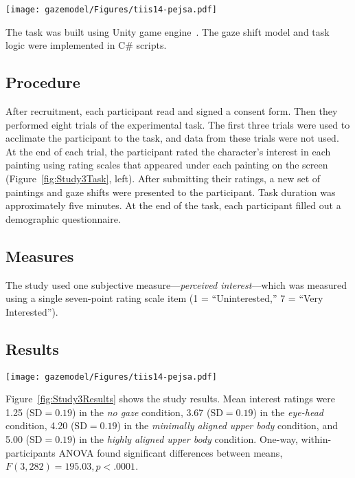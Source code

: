 \begin{figure*}
\centering
\texttt{[image: gazemodel/Figures/tiis14-pejsa.pdf]}
\caption{Experimental task in Study 3. Left: Task interface. Right: An experimenter demonstrating the task.}
\label{fig:Study3Task}
\end{figure*}

The task was built using Unity game engine~\citep{unity3d}. The gaze shift model and task logic were implemented in C\# scripts.

\subsection{Procedure}

After recruitment, each participant read and signed a consent form. Then they performed eight trials of the experimental task. The first three trials were used to acclimate the participant to the task, and data from these trials were not used. At the end of each trial, the participant rated the character's interest in each painting using rating scales that appeared under each painting on the screen (Figure~\ref{fig:Study3Task}, left). After submitting their ratings, a new set of paintings and gaze shifts were presented to the participant. Task duration was approximately five minutes. At the end of the task, each participant filled out a demographic questionnaire.

\subsection{Measures}

The study used one subjective measure---\emph{perceived interest}---which was measured using a single seven-point rating scale item (1 = ``Uninterested,'' 7 = ``Very Interested'').

\subsection{Results}

\begin{figure*}
\centering
\texttt{[image: gazemodel/Figures/tiis14-pejsa.pdf]}
\caption{Results for perceived interest ratings for each type of gaze shift. Results for gaze shifts with upper body movement are shown in red.}
\label{fig:Study3Results}
\end{figure*}

Figure~\ref{fig:Study3Results} shows the study results. Mean interest ratings were 1.25 ($\mathrm{SD} = 0.19$) in the \emph{no gaze} condition, 3.67 ($\mathrm{SD} = 0.19$) in the \emph{eye-head} condition, 4.20 ($\mathrm{SD} = 0.19$) in the \emph{minimally aligned upper body} condition, and 5.00 ($\mathrm{SD} = 0.19$) in the \emph{highly aligned upper body} condition. One-way, within-participants ANOVA found significant differences between means, $F(3, 282) = 195.03, p < .0001$.

